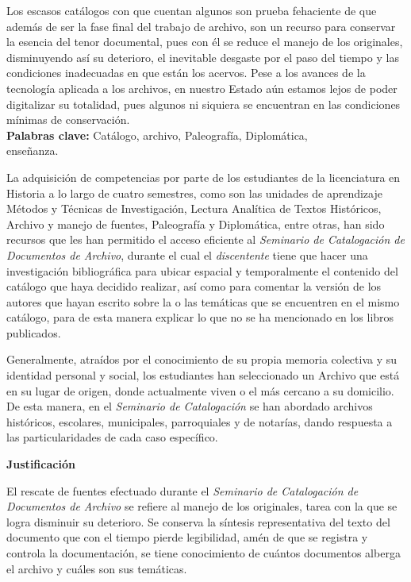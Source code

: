 \enlargethispage{1\baselineskip}
Los escasos catálogos con que cuentan algunos son prueba fehaciente de que
además de ser la fase final del trabajo de archivo, son un recurso para
conservar la esencia del tenor documental, pues con él se reduce el manejo
de los originales, disminuyendo así su deterioro, el inevitable desgaste
por el paso del tiempo y las condiciones inadecuadas en que están los
acervos. Pese a los avances de la tecnología aplicada a los archivos, en
nuestro Estado aún estamos lejos de poder digitalizar su totalidad, pues
algunos ni siquiera se encuentran en las condiciones mínimas de
conservación.\\ 
\textbf{Palabras clave:} Catálogo, archivo, Paleografía,
Diplomática,\\ enseñanza.

\noindent La adquisición de competencias por parte de los 
estudiantes de la licenciatura en Historia a lo largo de cuatro 
semestres, como son las unidades de aprendizaje Métodos y Técnicas de 
Investigación, Lectura Analítica de Textos Históricos, Archivo y manejo 
de fuentes, Paleografía y Diplomática, entre otras, han sido recursos 
que les han permitido el acceso eficiente al 
\textit{Seminario de Catalogación de Documentos de Archivo}, durante el 
cual el {\itshape discentente} tiene que hacer una investigación bibliográfica para 
ubicar espacial y temporalmente el contenido del catálogo que haya 
decidido realizar, así como para comentar la versión de los autores 
que hayan escrito sobre la o las temáticas que se encuentren en el 
mismo catálogo, para de esta manera explicar lo que no se ha mencionado 
en los libros publicados. 

Generalmente, atraídos por el conocimiento de su propia memoria 
colectiva y su identidad personal y social, los estudiantes han 
seleccionado un Archivo que está en su lugar de  origen, donde 
actualmente viven o el más cercano a su domicilio. De esta manera, en el 
\textit{Seminario de Catalogación} se han abordado archivos históricos, 
escolares, municipales, parroquiales y de notarías, dando respuesta a 
las particularidades de cada caso específico.

\medskip
\noindent \textbf{Justificación}
\enlargethispage{1\baselineskip}

\noindent El rescate de fuentes efectuado durante el \textit{Seminario de 
Catalogación de Documentos de Archivo} se refiere al manejo de los 
originales, tarea con la que se logra disminuir su deterioro. Se conserva la síntesis 
representativa del texto del documento que con el tiempo pierde 
legibilidad, amén de que se registra y controla la documentación, se 
tiene conocimiento de cuántos documentos alberga el archivo y cuáles 
son sus temáticas.

